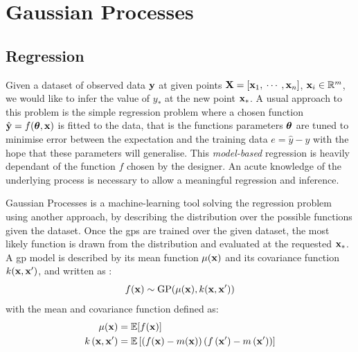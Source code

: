 \section{Gaussian Processes}\label{C2:gaussian_processes}
\subsection{Regression}
Given a dataset of observed data $\boldsymbol{\mathbf{y}}$ at given points $\boldsymbol{\mathbf{X}} = \left [\boldsymbol{\mathbf{x}}_1, \: \cdots \: , \boldsymbol{\mathbf{x}}_n \right ]$, $\boldsymbol{\mathbf{x}}_i \in \mathbb{R}^{m}$, we would like to infer the value of $y_\ast$ at the new point $\boldsymbol{\mathbf{x}}_\ast$. A usual approach to this problem is the simple regression problem where a chosen function $\hat{\boldsymbol{\mathbf{y}}} = f(\boldsymbol{\mathbf{\theta}}, \boldsymbol{\mathbf{x}})$ is fitted to the data, that is the functions parameters $\boldsymbol{\mathbf{\theta}}$ are tuned to minimise error between the expectation and the training data $e=\hat{y} - y$ with the hope that these parameters will generalise. This \emph{model-based} regression is heavily dependant of the function $f$ chosen by the designer. An acute knowledge of the underlying process is necessary to allow a meaningful regression and inference. 

Gaussian Processes is a machine-learning tool solving the regression problem using another approach, by describing the distribution over the possible functions given the dataset. Once the \gls{gps} are trained over the given dataset, the most likely function is drawn from the distribution and evaluated at the requested $\boldsymbol{\mathbf{x}}_\ast$. A \gls{gp} model is described by its mean function $\mu(\boldsymbol{\mathbf{x}})$ and its covariance function $k(\boldsymbol{\mathbf{x}}, \boldsymbol{\mathbf{x}}')$, and written as \cite{murphy_machine_2012}:
\begin{equation}
	f(\boldsymbol{\mathbf{x}}) \sim \text{GP}(\mu(\boldsymbol{\mathbf{x}}), k(\boldsymbol{\mathbf{x}}, \boldsymbol{\mathbf{x}}'))
\end{equation}
with the mean and covariance function defined as:
\begin{align}
\mu(\boldsymbol{\mathbf{x}}) &=\mathbb{E}[f(\boldsymbol{\mathbf{x}})] \\
k\left(\boldsymbol{\mathbf{x}}, \boldsymbol{\mathbf{x}}^{\prime}\right) &=\mathbb{E}\left[(f(\boldsymbol{\mathbf{x}})-m(\boldsymbol{\mathbf{x}}))\left(f\left(\boldsymbol{\mathbf{x}}^{\prime}\right)-m\left(\boldsymbol{\mathbf{x}}^{\prime}\right)\right)\right]
\end{align}

